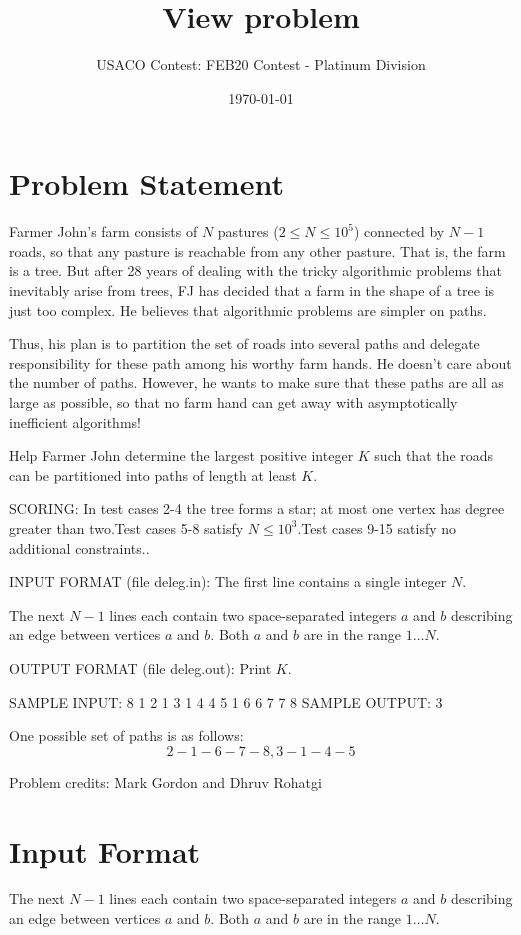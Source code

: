 \documentclass[12pt]{article}
\title{View problem}
\author{USACO Contest: FEB20 Contest - Platinum Division}
\date{\today}
\begin{document}
\maketitle

\section*{Problem Statement}

Farmer John's farm consists of $N$ pastures ($2 \leq N \leq 10^5$) connected by
$N-1$ roads, so that any pasture is reachable from any other pasture. That is,
the farm is a tree. But after 28 years of dealing with the tricky algorithmic
problems that inevitably arise from trees, FJ has decided that a farm in the
shape of a tree is just too complex. He believes that algorithmic problems are
simpler on paths.

Thus, his plan is to partition the set of roads into several paths and delegate
responsibility for these path among his worthy farm hands. He doesn't care about
the number of paths. However, he wants to make sure that these paths are all as
large as possible, so that no farm hand can get away with asymptotically
inefficient algorithms!

Help Farmer John determine the largest positive integer $K$ such that the roads
can be partitioned into paths of length at least $K$.

SCORING:
In test cases 2-4 the tree forms a star; at most one vertex has degree
greater than two.Test cases 5-8 satisfy $N\le 10^3$.Test cases 9-15 satisfy no additional constraints..

INPUT FORMAT (file deleg.in):
The first line contains a single integer $N$. 

The next $N-1$ lines each contain two space-separated integers $a$ and $b$
describing an edge between vertices $a$ and $b$.  Both $a$ and $b$ are in the
range $1 \ldots N$. 

OUTPUT FORMAT (file deleg.out):
Print $K$.

SAMPLE INPUT:
8
1 2
1 3
1 4
4 5
1 6
6 7
7 8
SAMPLE OUTPUT: 
3

One possible set of paths is as follows:
$$2-1-6-7-8, 3-1-4-5$$

Problem credits: Mark Gordon and Dhruv Rohatgi



\section*{Input Format}
The next $N-1$ lines each contain two space-separated integers $a$ and $b$
describing an edge between vertices $a$ and $b$.  Both $a$ and $b$ are in the
range $1 \ldots N$.
\end{document}
